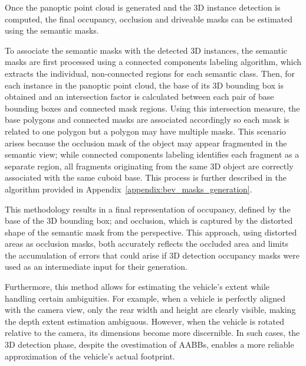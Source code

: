  \label{sec:instance_bev_mask_methodology}
Once the panoptic point cloud is generated and the 3D instance detection is computed, the final occupancy, occlusion and driveable masks can be estimated using the  semantic masks.

To associate the  semantic masks with the detected 3D instances, the semantic masks are first processed using a connected components labeling algorithm, which extracts the individual, non-connected regions for each semantic class. Then, for each instance in the panoptic point cloud, the base of its 3D bounding box is obtained and an intersection factor is calculated between each pair of base bounding boxes and connected mask regions. Using this intersection measure, the base polygons and connected masks are associated accordingly so each mask is related to one polygon but a polygon may have multiple masks. This scenario arises because the occlusion mask of the object may appear fragmented in the  semantic view; while connected components labeling identifies each fragment as a separate region, all fragments originating from the same 3D object are correctly associated with the same cuboid base. This process is further described in the algorithm provided in Appendix~\ref{appendix:bev_masks_generation}.

This methodology results in a final representation of occupancy, defined by the base of the 3D bounding box; and occlusion, which is captured by the distorted shape of the semantic mask from the  perspective. This approach, using distorted areas as occlusion masks, both accurately reflects the occluded area and limits the accumulation of errors that could arise if 3D detection occupancy masks were used as an intermediate input for their generation.

Furthermore, this method allows for estimating the vehicle's extent while handling certain ambiguities. For example, when a vehicle is perfectly aligned with the camera view, only the rear width and height are clearly visible, making the depth extent estimation ambiguous. However, when the vehicle is rotated relative to the camera, its dimensions become more discernible. In such cases, the 3D detection phase, despite the ovestimation of \acp{AABB}, enables a more reliable approximation of the vehicle's actual footprint.


